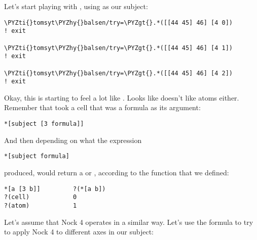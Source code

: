 Let's start playing with , using \kode{[[44 45] 46]} as our subject:
\begin{framed_shaded}
\begin{Verbatim}[fontsize=\relsize{-2.5},fontseries=b,commandchars=\\\{\}]
\PYZti{}tomsyt\PYZhy{}balsen/try=\PYZgt{}.*([[44 45] 46] [4 0])
! exit

\PYZti{}tomsyt\PYZhy{}balsen/try=\PYZgt{}.*([[44 45] 46] [4 1])
! exit

\PYZti{}tomsyt\PYZhy{}balsen/try=\PYZgt{}.*([[44 45] 46] [4 2])
! exit
\end{Verbatim}
\end{framed_shaded}
Okay, this is starting to feel a lot like . Looks like  doesn't
like atoms either. Remember that  took a cell that was a formula as its
argument:
\begin{framed_shaded}
\begin{Verbatim}[fontsize=\relsize{-2.5},fontseries=b,commandchars=\\\{\}]
*[subject [3 formula]]
\end{Verbatim}
\end{framed_shaded}
And then depending on what the expression
\begin{framed_shaded}
\begin{Verbatim}[fontsize=\relsize{-2.5},fontseries=b,commandchars=\\\{\}]
*[subject formula]
\end{Verbatim}
\end{framed_shaded}
produced,  would return a  or , according to the function 
that we defined:
\begin{framed_shaded}
\begin{Verbatim}[fontsize=\relsize{-2.5},fontseries=b,commandchars=\\\{\}]
*[a [3 b]]         ?(*[a b])
?(cell)            0
?(atom)            1
\end{Verbatim}
\end{framed_shaded}
Let's assume that Nock 4 operates in a similar way. Let's use the formula \kode{[0
n]} to try to apply Nock 4 to different axes in our subject:

